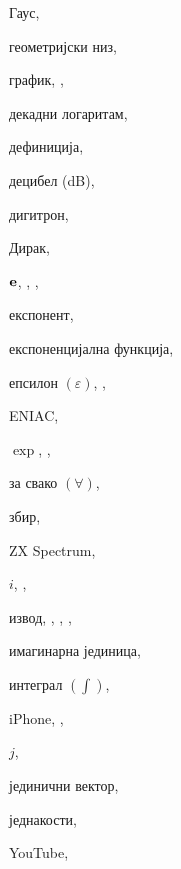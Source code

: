 \begin{theindex}
  \indexspace

  \item Гаус, 
  \item геометријски низ, 
  \item график, , 

  \indexspace

  \item декадни логаритам, 
  \item дефиниција, 
  \item децибел (dB), 
  \item дигитрон, 
  \item Дирак, 

  \indexspace

  \item ${\bf e}$, , , 
  \item експонент, 
  \item експоненцијална функција, 
  \item епсилон $(\varepsilon)$, , 
  \indexskip
  \item ENIAC, 
  \item $\exp$, , 

  \indexspace

  \item за свако $(\forall )$, 
  \item збир, 
  \indexskip
  \item \textsf{ZX Spectrum}, 

  \indexspace

  \item $i$, , 
  \item извод, , , , 
  \item имагинарна јединица, 
  \item интеграл $(\int)$, 
  \indexskip
  \item iPhone, , 

  \indexspace

  \item $j$, 
  \item јединични вектор, 
  \item једнакости, 
  \indexskip
  \item {\sf  YouTube}, 


\end{theindex}
